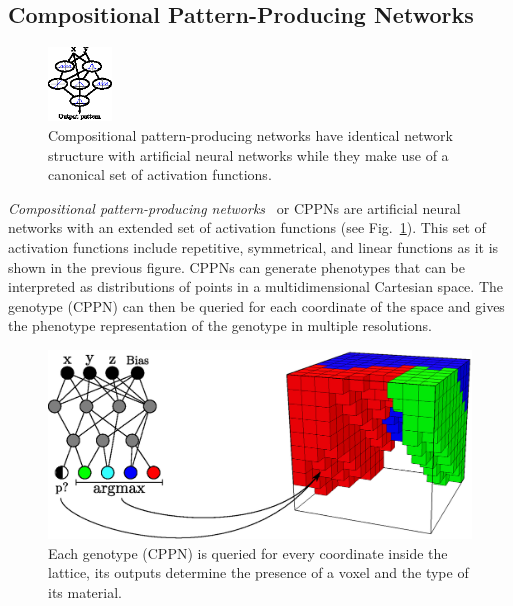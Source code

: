 \documentclass{sig-alternate}
\begin{document}
\subsection{Compositional Pattern-Producing Networks}

\begin{figure}[b!]
\centering
\includegraphics[width=0.15\textwidth]{../Figures/Misc/cppnNetwork.eps}
\caption{Compositional pattern-producing networks have identical network structure with artificial neural networks while they make use of a canonical set of activation functions.}
\label{fig:cppnNetwork}
\end{figure}

\emph{Compositional pattern-producing networks}~\cite{stanley2007compositional} or CPPNs are artificial neural networks with an extended set of activation functions (see Fig.~\ref{fig:cppnNetwork}). This set of activation functions include repetitive, symmetrical, and linear functions as it is shown in the previous figure. CPPNs can generate phenotypes that can be interpreted as distributions of points in a multidimensional Cartesian space. The genotype (CPPN) can then be queried for each coordinate of the space and gives the phenotype representation of the genotype in multiple resolutions.

\begin{figure}[t!]
\centering
\includegraphics[width=0.35\textheight]{../Figures/Misc/cppnSoftBot.eps}
\caption{Each genotype (CPPN) is queried for every coordinate inside the lattice, its outputs determine the presence of a voxel and the type of its material.}
\label{fig:cppnDiagram}
\end{figure}
\end{document}
